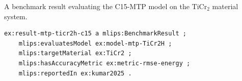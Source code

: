 A benchmark result evaluating the C15-MTP model on the TiCr$_2$ material system.
\begin{lstlisting}[language=turtle]
ex:result-mtp-ticr2h-c15 a mlips:BenchmarkResult ;
    mlips:evaluatesModel ex:model-mtp-TiCr2H ;
    mlips:targetMaterial ex:TiCr2 ;
    mlips:hasAccuracyMetric ex:metric-rmse-energy ;
    mlips:reportedIn ex:kumar2025 .
\end{lstlisting}
